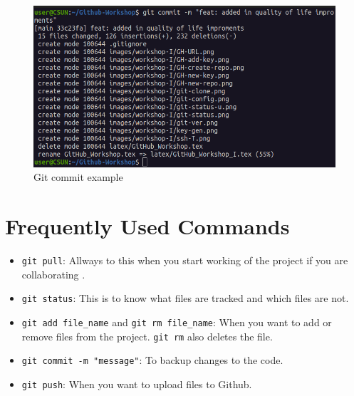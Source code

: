 \documentclass[12pt, a4paper]{article}
\begin{document}
\begin{figure}[H]
\centering
\includegraphics[scale=0.5]{../images/workshop-I/git-commit.png}
\caption{Git commit example}
\end{figure}

\section{Frequently Used Commands}
\begin{itemize}
    \item \verb`git pull`: Allways to this when you start working of the project if you are collaborating .
    \item \verb`git status`: This is to know what files are tracked and which files are not.
    \item \verb`git add file_name` and \verb`git rm file_name`: When you want to add or remove files from the project. \verb`git rm` also deletes the file.
    \item \verb`git commit -m "message"`: To backup changes to the code.
    \item \verb`git push`: When you want to upload files to Github.
\end{itemize}


\clearpage 
\end{document}
